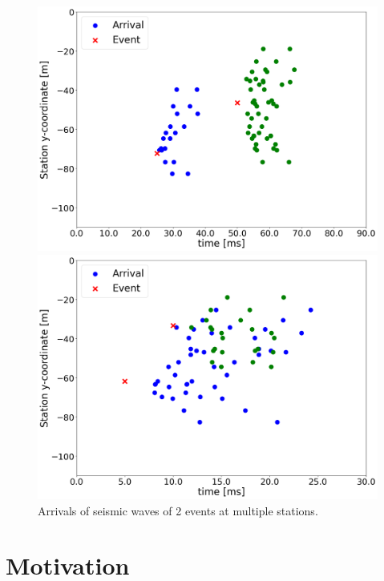 \documentclass{scrreprt}
\begin{document}
\begin{figure}[ht]
    \centering
    \begin{minipage}{0.49\textwidth}
        \centering
        \includegraphics[width=\textwidth]{plots/separated.png}
    \end{minipage}
    \hfill
    \begin{minipage}{0.49\textwidth}
        \centering
        \includegraphics[width=\textwidth]{plots/unseparated.png}

    \end{minipage}
    \caption{\label{fig:arrival}Arrivals of seismic waves of 2 events at multiple stations.}
\end{figure}

\section{Motivation}
\end{document}
